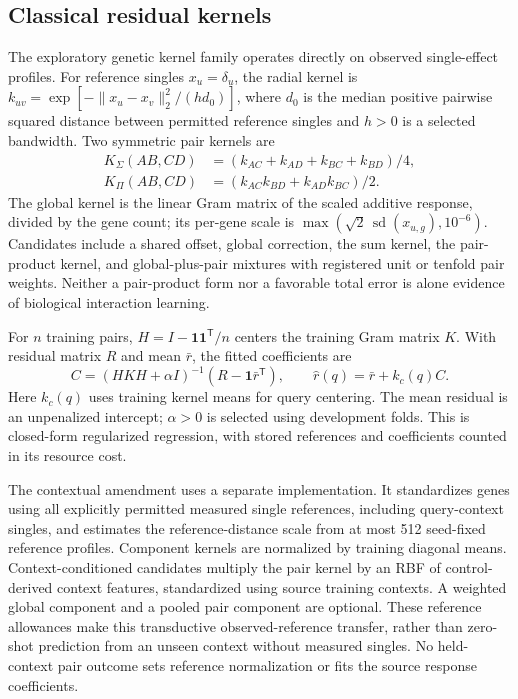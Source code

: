 \documentclass{article}
\begin{document}
\subsection{Classical residual kernels}
The exploratory genetic kernel family operates directly on observed single-effect profiles. For reference singles $x_u=\delta_u$, the radial kernel is $k_{uv}=\exp[-\lVert x_u-x_v\rVert_2^2/(h d_0)]$, where $d_0$ is the median positive pairwise squared distance between permitted reference singles and $h>0$ is a selected bandwidth. Two symmetric pair kernels are
\begin{align}
K_{\Sigma}(AB,CD)&=(k_{AC}+k_{AD}+k_{BC}+k_{BD})/4,\\
K_{\Pi}(AB,CD)&=(k_{AC}k_{BD}+k_{AD}k_{BC})/2.
\end{align}
The global kernel is the linear Gram matrix of the scaled additive response, divided by the gene count; its per-gene scale is $\max(\sqrt{2}\,\operatorname{sd}(x_{u,g}),10^{-6})$. Candidates include a shared offset, global correction, the sum kernel, the pair-product kernel, and global-plus-pair mixtures with registered unit or tenfold pair weights. Neither a pair-product form nor a favorable total error is alone evidence of biological interaction learning.

For $n$ training pairs, $H=I-\mathbf{1}\mathbf{1}^{\mathsf T}/n$ centers the training Gram matrix $K$. With residual matrix $R$ and mean $\bar r$, the fitted coefficients are
\begin{equation}C=(HKH+\alpha I)^{-1}(R-\mathbf{1}\bar r^{\mathsf T}),\qquad \widehat r(q)=\bar r+k_c(q)C.\end{equation}
Here $k_c(q)$ uses training kernel means for query centering. The mean residual is an unpenalized intercept; $\alpha>0$ is selected using development folds. This is closed-form regularized regression, with stored references and coefficients counted in its resource cost.

The contextual amendment uses a separate implementation. It standardizes genes using all explicitly permitted measured single references, including query-context singles, and estimates the reference-distance scale from at most 512 seed-fixed reference profiles. Component kernels are normalized by training diagonal means. Context-conditioned candidates multiply the pair kernel by an RBF of control-derived context features, standardized using source training contexts. A weighted global component and a pooled pair component are optional. These reference allowances make this transductive observed-reference transfer, rather than zero-shot prediction from an unseen context without measured singles. No held-context pair outcome sets reference normalization or fits the source response coefficients.
\end{document}
